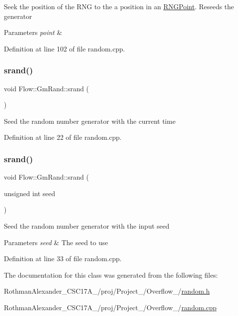 Seek the position of the R\+NG to the a position in an \hyperlink{struct_flow_1_1_r_n_g_point}{R\+N\+G\+Point}. Reseeds the generator 
\begin{DoxyParams}{Parameters}
{\em point} & \\
\hline
\end{DoxyParams}


Definition at line 102 of file random.\+cpp.

\hypertarget{class_flow_1_1_gm_rand_aadd656b294e8e7330ba408486646e2f3}{}\label{class_flow_1_1_gm_rand_aadd656b294e8e7330ba408486646e2f3} 
\subsubsection{\texorpdfstring{srand()}{srand()}\hspace{0.1cm}{\footnotesize\ttfamily [1/2]}}
{\footnotesize\ttfamily void Flow\+::\+Gm\+Rand\+::srand (\begin{DoxyParamCaption}{ }\end{DoxyParamCaption})}

Seed the random number generator with the current time 

Definition at line 22 of file random.\+cpp.

\hypertarget{class_flow_1_1_gm_rand_abc8aefeb9e15a414964e6e9b0665a8e7}{}\label{class_flow_1_1_gm_rand_abc8aefeb9e15a414964e6e9b0665a8e7} 
\subsubsection{\texorpdfstring{srand()}{srand()}\hspace{0.1cm}{\footnotesize\ttfamily [2/2]}}
{\footnotesize\ttfamily void Flow\+::\+Gm\+Rand\+::srand (\begin{DoxyParamCaption}\item[{unsigned int}]{seed }\end{DoxyParamCaption})}

Seed the random number generator with the input seed 
\begin{DoxyParams}{Parameters}
{\em seed} & The seed to use \\
\hline
\end{DoxyParams}


Definition at line 33 of file random.\+cpp.



The documentation for this class was generated from the following files\+:\begin{DoxyCompactItemize}
\item 
Rothman\+Alexander\+\_\+\+C\+S\+C17\+A\+\_/proj/\+Project\+\_/\+Overflow\+\_/\hyperlink{random_8h}{random.\+h}\item 
Rothman\+Alexander\+\_\+\+C\+S\+C17\+A\+\_/proj/\+Project\+\_/\+Overflow\+\_/\hyperlink{random_8cpp}{random.\+cpp}\end{DoxyCompactItemize}
